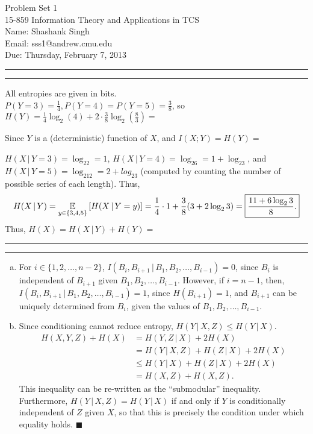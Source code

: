 \documentclass[11pt]{article}
\makeatletter
\newcounter{questionCounter}
\newcounter{partCounter}[questionCounter]
\newenvironment{question}[2][\arabic{questionCounter}]{%
    \setcounter{partCounter}{0}%
    \vspace{.25in} \hrule \vspace{0.5em}%
        \noindent{\bf #2}%
    \vspace{0.8em} \hrule \vspace{.10in}%
    \addtocounter{questionCounter}{1}%
}{}
\newcommand{\myname}{Shashank Singh}
\newcommand{\myandrew}{sss1@andrew.cmu.edu}
\newcommand{\myclass}{15-859 Information Theory and Applications in TCS}
\newcommand{\myhwnum}{1}
\newcommand{\duedate}{Thursday, February 7, 2013}
\renewcommand{\qed}{\quad $\blacksquare$}
\newcommand{\pr}[1]{\mathsf{P}\left( #1 \right)} %
\newcommand{\E}[2]{\operatornamewithlimits{\mathbb{E}}_{#2}\left[ #1 \right]} %
\newcommand{\giv}{\, | \,} %
\makeatother
\begin{document}
\thispagestyle{plain}

{\Large Problem Set \myhwnum} \\
\myclass \\
Name: \myname \\
Email: \myandrew \\
Due: \duedate \\

\begin{question}{Problem 1}
All entropies are given in bits.\\
$P(Y = 3) = \frac14, P(Y = 4) = P(Y = 5) = \frac38$, so
$\displaystyle
H(Y) = \frac{1}{4}\log_2(4) + 2 \cdot \frac{3}{8}\log_2\left(\frac83\right) = $

Since $Y$ is a (deterministic) function of $X$, \fbox{$H(Y \giv X) = 0$} and
$I(X; Y) = H(Y) = $ 

$H(X \giv Y = 3) = \log_22 = 1$, $H(X \giv Y = 4) = \log_26 = 1 +
\log_23$, and $H(X \giv Y = 5) = \log_212 = 2 + log_23$ (computed by counting
the number of possible series of each length). Thus, \[H(X \giv Y) = \E{H(X \giv
Y = y)}{y \in \{3,4,5\}} = \frac14 \cdot 1 + \frac38 (3 + 2\log_23) =
\mbox{\fbox{$\displaystyle \frac{11 + 6\log_23}{8}$.}}
\]
Thus, $H(X) = H(X \giv Y) + H(Y) = $ 

\end{question}

\begin{question}{Problem 2}
\begin{enumerate}[(a)]
\item
For $i \in \{1,2,\ldots,n - 2\}$,
$I(B_i,B_{i + 1}\giv B_1,B_2,\ldots,B_{i - 1}) = 0$, since $B_i$ is independent
of $B_{i + 1}$ given $B_1,B_2,\ldots,B_{i - 1}$. However, if $i = n - 1$, then,
$I(B_i,B_{i + 1}\giv B_1,B_2,\ldots,B_{i - 1}) = 1$, since $H(B_{i + 1}) = 1$,
and $B_{i + 1}$ can be uniquely determined from $B_i$, given the values of
$B_1,B_2,\dots,B_{i - 1}$.

\item Since conditioning cannot reduce entropy,
$H(Y\giv X,Z) \leq H(Y \giv X)$.
\begin{align*}
H(X,Y,Z) + H(X)
 & =    H(Y,Z \giv X) + 2H(X) \\
 & =    H(Y \giv X,Z) + H(Z \giv X) + 2H(X) \\
 & \leq H(Y \giv X) + H(Z \giv X) + 2H(X) \\
 & =    H(X,Z) + H(X,Z).
\end{align*}
This inequality can be re-written as the ``submodular'' inequality.
Furthermore, $H(Y \giv X,Z) = H(Y \giv X)$ if and only if $Y$ is conditionally
independent of $Z$ given $X$, so that this is precisely the condition under
which equality holds. \qed

\end{enumerate}
\end{question}
\end{document}
